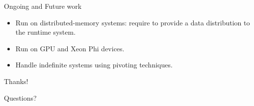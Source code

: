 \documentclass[unknownkeysallowed]{beamer}
\newcommand{\db}[1]{\textcolor{mblue}{#1\xspace}}
\begin{document}
\begin{frame}{Ongoing and Future work}

  \begin{itemize}
  \item Run on \alert{distributed-memory} systems: require to provide
    a data distribution to the runtime system.

    \vspace{0.4cm}

  \item Run on \db{GPU} and \db{Xeon Phi} devices.

    \vspace{0.4cm}

  \item Handle \alert{indefinite} systems using pivoting techniques.
  \end{itemize}

\end{frame}

\begin{frame}[plain]{}
  \begin{center}
    \vspace{2cm}

    {\Huge Thanks!}

    \vspace{1cm}

    {\huge Questions?}

    \vspace{2cm}

  \end{center}
\end{frame}
\end{document}
